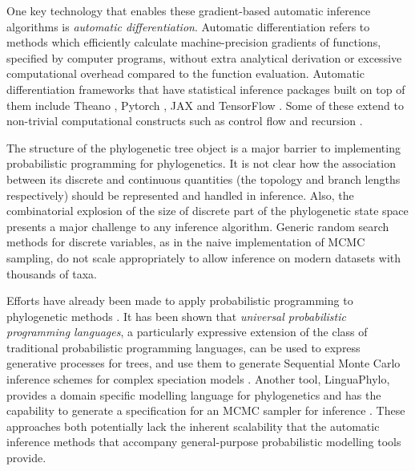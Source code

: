 One key technology that enables these gradient-based automatic inference algorithms is \textit{automatic differentiation}. Automatic differentiation refers to methods which efficiently calculate machine-precision gradients of functions, specified by computer programs, without extra analytical derivation or excessive computational overhead compared to the function evaluation. Automatic differentiation frameworks that have statistical inference packages built on top of them include Theano \cite{bergstra2010theano}, Pytorch \cite{paszke2019pytorch}, JAX \cite{jax2018github} and TensorFlow \cite{abadi2016tensorflow}. Some of these extend to non-trivial computational constructs such as control flow and recursion \cite{yu2018dynamic}.

The structure of the phylogenetic tree object is a major barrier to implementing probabilistic programming for phylogenetics. It is not clear how the association between its discrete and continuous quantities (the topology and branch lengths respectively) should be represented and handled in inference. Also, the combinatorial explosion of the size of discrete part of the phylogenetic state space presents a major challenge to any inference algorithm. Generic random search methods for discrete variables, as in the naive implementation of MCMC sampling, do not scale appropriately to allow inference on modern datasets with thousands of taxa.

Efforts have already been made to apply probabilistic programming to phylogenetic methods
\cite{fourment2019evaluating, ronquist2021universal, drummond2022linguaphylo}. It has been shown that \textit{universal probabilistic programming languages}, a particularly expressive extension of the class of traditional probabilistic programming languages, can be used to express generative processes for trees, and use them to generate Sequential Monte Carlo inference schemes for complex speciation models \cite{ronquist2021universal}. Another tool, LinguaPhylo, provides a domain specific modelling language for phylogenetics and has the capability to generate a specification for an MCMC sampler for inference \cite{drummond2022linguaphylo}. These approaches both potentially lack the inherent scalability that the automatic inference methods that accompany general-purpose probabilistic modelling tools provide.

